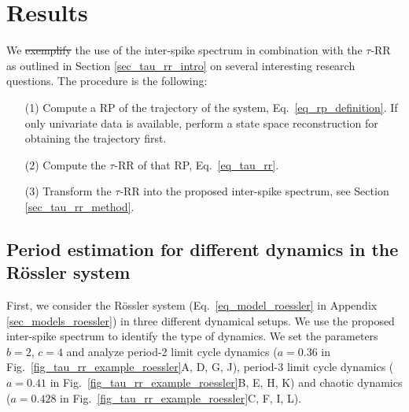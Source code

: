 \documentclass[entropy,article,submit,pdftex,moreauthors]{Definitions/mdpi}
\providecommand{\DIFadd}[1]{{\protect\color{blue}\uwave{#1}}} %
\providecommand{\DIFdel}[1]{{\protect\color{red}\sout{#1}}}                      %
\providecommand{\DIFaddbegin}{} %
\providecommand{\DIFaddend}{} %
\providecommand{\DIFdelbegin}{} %
\providecommand{\DIFdelend}{} %
\begin{document}
\DIFaddend %
\section{Results}\label{sec_tau_rr_application}

We \DIFdelbegin \DIFdel{exemplify }\DIFdelend \DIFaddbegin \DIFadd{demonstrate }\DIFaddend the use of the inter-spike spectrum in combination with the $\tau$-RR as outlined in 
Section \ref{sec_tau_rr_intro} on several interesting research questions. The procedure is the following:
\begin{itemize}[noitemsep]
\item[(1)] Compute a RP of the trajectory of the system, Eq.~\eqref{eq_rp_definition}. If only univariate data is available, perform a state space reconstruction for obtaining the trajectory first.
\item[(2)] Compute the $\tau$-RR of that RP, Eq.~\eqref{eq_tau_rr}.
\item[(3)] Transform the $\tau$-RR into the proposed inter-spike spectrum, see Section \ref{sec_tau_rr_method}.
\end{itemize}


\subsection{Period estimation for different dynamics in the R\"ossler system}
First, we consider the R\"ossler system (Eq.~\eqref{eq_model_roessler} in Appendix \ref{sec_models_roessler}) 
in three different dynamical setups. We use the proposed inter-spike spectrum to
identify the type of dynamics.
We set the parameters $b=2$, $c=4$ and analyze period-2 limit cycle dynamics ($a=0.36$ in Fig.~\ref{fig_tau_rr_example_roessler}A, D, G, J), 
period-3 limit cycle dynamics ($a=0.41$ in Fig.~\ref{fig_tau_rr_example_roessler}B, E, H, K) and chaotic dynamics ($a=0.428$ in Fig.~\ref{fig_tau_rr_example_roessler}C, F, I, L).  
\end{document}
